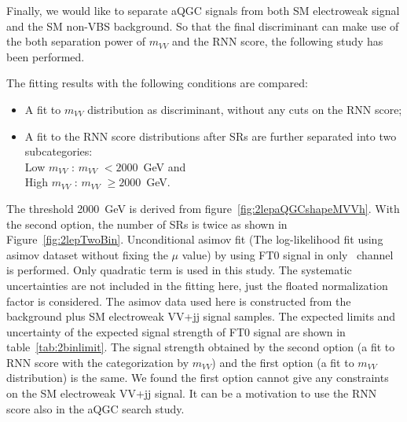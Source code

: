 Finally, we would like to separate aQGC signals from both SM electroweak signal and the SM non-VBS background.
So that the final discriminant can make use of the both separation power of $m_{VV}$ and the RNN score, the following study has been performed.

The fitting results with the following conditions are compared:
\begin{itemize}
  \item A fit to $m_{VV}$ distribution as discriminant, without any cuts on the RNN score;
  \item A fit to the RNN score distributions after
        SRs are further separated into two subcategories: \\
        Low $m_{VV}$ : $m_{VV}$ $< 2000$~GeV and \\
        High $m_{VV}$ : $m_{VV}$ $\geq 2000$~GeV. \\
\end{itemize}
The threshold 2000~GeV is derived from figure~\ref{fig:2lepaQGCshapeMVVh}.
With the second option, the number of SRs is twice as shown in Figure~\ref{fig:2lepTwoBin}.
Unconditional asimov fit (The log-likelihood fit using asimov dataset without fixing the $\mu$ value) by using FT0 signal in only \tlep\ channel is performed.
Only quadratic term is used in this study.
The systematic uncertainties are not included in the fitting here, just the floated normalization factor is considered.
The asimov data used here is constructed from the background plus SM electroweak VV+jj signal samples.
The expected limits and uncertainty of the expected signal strength of FT0 signal are shown in table~\ref{tab:2binlimit}.
The signal strength obtained by the second option (a fit to RNN score with the categorization by $m_{VV}$) and the first option (a fit to $m_{VV}$ distribution) is the same. 
We found the first option cannot give any constraints on the SM electroweak VV+jj signal.
It can be a motivation to use the RNN score also in the aQGC search study.

